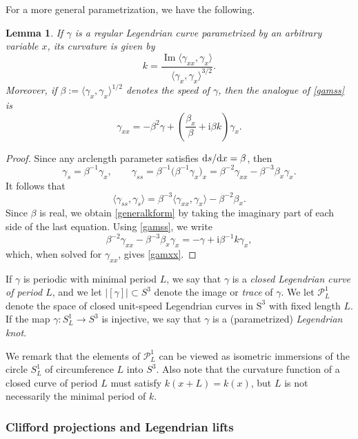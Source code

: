 \documentclass[10pt,a4paper]{amsart}
\def\rS{{\mathrm S}}
\newcommand\Legu{ {\mathcal P}^1} %
\newcommand\kk{k} %
\newcommand\speed{\beta} %
\def\ri{\mathrm{i}}
\def\gam{\gamma} %
\renewcommand\Im{\operatorname{Im}}
\numberwithin{equation}{section}
\newtheorem{Lemma}[Theorem]{Lemma}
\begin{document}
For a more general parametrization, we have the following.
\begin{Lemma}
If $\gam$ is a regular Legendrian curve parametrized by an arbitrary variable $x$, its curvature is given by
\begin{equation}\label{generalkform}
 \kk = \dfrac{ \Im \langle \gam_{xx}, \gam_x \rangle}{\quad \langle \gam_x, \gam_x\rangle^{3/2}}.
\end{equation}
Moreover, if $\speed:=\langle \gam_x, \gam_x\rangle^{1/2}$ denotes the {\it speed} of $\gam$,
then the analogue of \eqref{gamss} is
\begin{equation}\label{gamxx}
\gam_{xx} = -\speed^2 \gam + \left( \dfrac{\speed_x}{\speed} + \ri \speed \kk\right) \gam_x.
\end{equation}
\end{Lemma}
\begin{proof} Since any arclength parameter satisfies ${\rm d}s/{\rm d}x=\speed$, then
\[
\gam_s =\speed^{-1} \gam_x , \qquad \gam_{ss}=\speed^{-1}\bigl(\speed^{-1} \gam_x\bigr)_x = \speed^{-2} \gam_{xx}-\speed^{-3} \speed_x \gam_x.
\]
It follows that
\[
\langle \gam_{ss}, \gam_s \rangle=\speed^{-3} \langle \gam_{xx}, \gam_x \rangle -\speed^{-2}\speed_x .
\]
Since $\speed$ is real, we obtain \eqref{generalkform} by taking the imaginary part of each side of the last equation. Using \eqref{gamss}, we write
\[
\speed^{-2} \gam_{xx}-\speed^{-3} \speed_x \gam_x =-\gam +\ri \speed^{-1} k\gam_x,
\]
which, when solved for $\gam_{xx}$, gives \eqref{gamxx}.
\end{proof}

\begin{Definition}
If $\gam$ is periodic with minimal period $L$, we say that $\gam$ is a {\it closed Legendrian curve of period $L$}, and we let $|[\gam]| \subset S^3 $ denote the image or
{\it trace} of $\gam$.
 We let $\Legu_L$ denote the space of closed unit-speed Legendrian curves in $\rS^3$ with fixed length $L$. If the map $\gam\colon S^1_L\to S^3$ is injective, we say that $\gam$ is a (parametrized) {\it Legendrian knot}.
\end{Definition}

We remark that the elements of $\Legu_L$ can be viewed as isometric immersions of the circle $S^1_L$ of circumference $L$ into $S^3$. Also note that the curvature function of a closed curve of period $L$ must satisfy $\kk(x+L)=\kk(x)$, but $L$ is not necessarily the
minimal period of $\kk$.


\subsubsection*{Clifford projections and Legendrian lifts}
\end{document}
